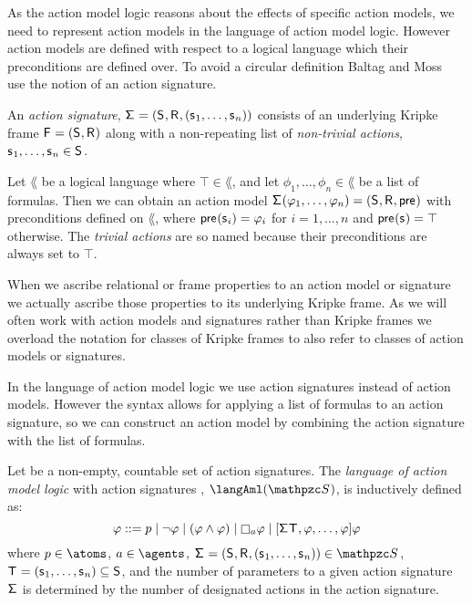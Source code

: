 As the action model logic reasons about the effects of specific action models, we need to represent action models in the language of action model logic.
However action models are defined with respect to a logical language which their preconditions are defined over.
To avoid a circular definition Baltag and Moss~\cite{baltag:2004} use the notion of an action signature.

\begin{definition}
An {\em action signature}, $\aSignatureAndTuple$ consists of an underlying Kripke frame $\aFrameAndTuple$ along with a non-repeating list of {\em non-trivial actions}, $\aStateS_1, \dots, \aStateS_n \in \aStates$.

Let $\lang$ be a logical language where $\top \in \lang$, and let $\phi_1, \dots, \phi_n \in \lang$ be a list of formulas.
Then we can obtain an action model $\aSignature(\phi_1, \dots, \phi_n) = \aModelTuple$ with preconditions defined on $\lang$, where $\aPrecondition(\aStateS_i) = \phi_i$ for $i = 1, \dots, n$ and $\aPrecondition(\aStateS) = \top$ otherwise.
The {\em trivial actions} are so named because their preconditions are always set to $\top$.
\end{definition}

When we ascribe relational or frame properties to an action model or signature we actually ascribe those properties to its underlying Kripke frame.
As we will often work with action models and signatures rather than Kripke frames we overload the notation for classes of Kripke frames to also refer to classes of action models or signatures.

In the language of action model logic we use action signatures instead of action models.
However the syntax allows for applying a list of formulas to an action signature, so we can construct an action model by combining the action signature with the list of formulas.

\begin{definition}
Let \aSignatureFamily{} be a non-empty, countable set of action signatures.
The {\em language of action model logic} with action signatures \aSignatureFamily{}, $\langAml(\aSignatureFamily)$, is inductively defined as:
$$
\phi ::=
    \atomP \mid
    \lnot \phi \mid
    (\phi \land \phi) \mid
    \necessaryA \phi \mid
    \actionA{\aSignature \aStatesT, \phi, \dots, \phi} \phi
$$
where $\atomP \in \atoms$, $\agentA \in \agents$, $\aSignatureAndTuple \in \aSignatureFamily$, $\aStatesT = (\aStateS_1, \dots, \aStateS_n) \subseteq \aStates$, and the number of parameters to a given action signature $\aSignature$ is determined by the number of designated actions in the action signature.
\end{definition}

